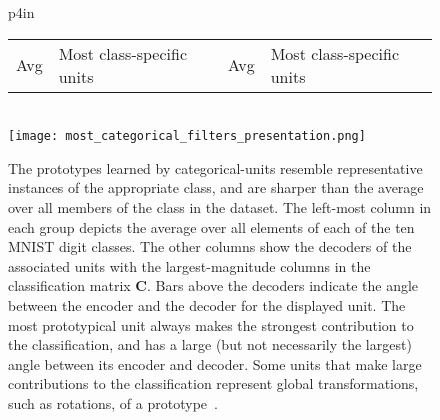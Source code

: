 \documentclass{article} %
\newcommand{\C}{\mathbf{C}}
\begin{document}
\begin{figure}[tb]
  \begin{center}
  \begin{tabular}{p{4in}}
    \hspace{-0.1in} \begin{tabular}{p{0.22in}p{1.6in}p{0.22in}p{1.4in}} Avg & Most class-specific units & Avg & Most class-specific units \end{tabular} \\
    \texttt{[image: most\_categorical\_filters\_presentation.png]} 
  \end{tabular}
  \end{center}
  \caption{The prototypes learned by categorical-units resemble representative instances of the appropriate class, and are sharper than the average over all members of the class in the dataset.  The left-most column in each group depicts the average over all elements of each of the ten MNIST digit classes.  The other columns show the decoders of the associated units with the largest-magnitude columns in the classification matrix $\C$.  Bars above the decoders indicate the angle between the encoder and the decoder for the displayed unit.  The most prototypical unit always makes the strongest contribution to the classification, and has a large (but not necessarily the largest) angle between its encoder and decoder.  Some units that make large contributions to the classification represent global transformations, such as rotations, of a prototype~\citep{simard1998}. \label{most_categorical_filters_figure}}
\end{figure}
\end{document}
